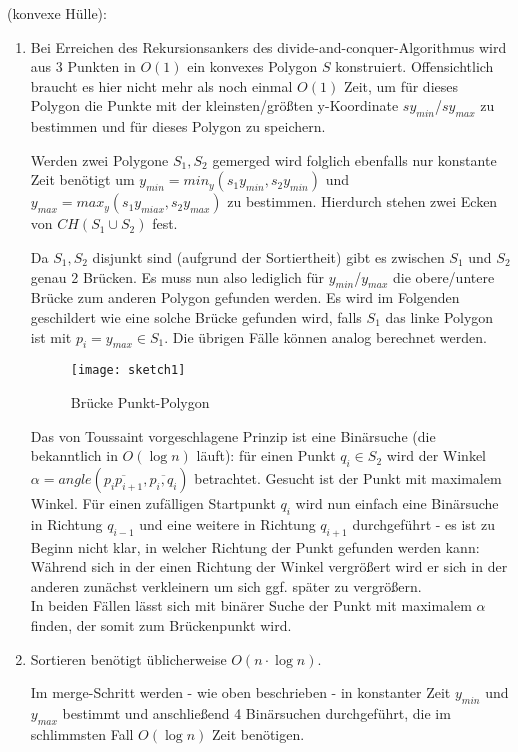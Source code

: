 \documentclass[a4paper, titlepage=false, parskip=full-, 10pt]{scrartcl}
\newcounter{tasknbr}
\newenvironment{task}[1]{{\bf Aufgabe \arabic {tasknbr}\stepcounter{tasknbr}} (#1):\begin{enumerate}}{\end{enumerate}}
\newcommand{\subtask}[1]{\item[#1)]}
\begin{document}
\begin{task}{konvexe Hülle}
\subtask{a}
Bei Erreichen des Rekursionsankers des divide-and-conquer-Algorithmus wird aus 3 Punkten in $O(1)$ ein konvexes Polygon $S$ konstruiert. Offensichtlich braucht es hier nicht mehr als noch einmal $O(1)$ Zeit, um für dieses Polygon die Punkte mit der kleinsten/größten y-Koordinate $sy_{min}$/$sy_{max}$ zu bestimmen und für dieses Polygon zu speichern.

Werden zwei Polygone $S_1,S_2$ gemerged wird folglich ebenfalls nur konstante Zeit benötigt um $y_{min}=min_y(s_1y_{min},s_2y_{min})$ und $y_{max}=max_y(s_1y_{miax},s_2y_{max})$ zu bestimmen. Hierdurch stehen zwei Ecken von $CH(S_1\cup S_2)$ fest.

Da $S_1,S_2$ disjunkt sind (aufgrund der Sortiertheit) gibt es zwischen $S_1$ und $S_2$ genau 2 Brücken. Es muss nun also lediglich für $y_{min}$/$y_{max}$ die obere/untere Brücke zum anderen Polygon gefunden werden. Es wird im Folgenden geschildert wie eine solche Brücke gefunden wird, falls $S_1$ das linke Polygon ist mit $p_i=y_{max}\in S_1$. Die übrigen Fälle können analog berechnet werden.
\begin{figure}[htpb]
\begin{center}
\texttt{[image: sketch1]}
\end{center}
\caption{Brücke Punkt-Polygon}
\end{figure}

Das von Toussaint vorgeschlagene Prinzip ist eine Binärsuche (die bekanntlich in $O(\log n)$ läuft): für einen Punkt $q_i\in S_2$ wird der  Winkel $\alpha=angle(\overline{p_ip_{i+1}},\overline{p_i,q_i})$ betrachtet. Gesucht ist der Punkt mit maximalem Winkel. Für einen zufälligen Startpunkt $q_i$ wird nun einfach eine Binärsuche in Richtung $q_{i-1}$ und eine weitere in Richtung $q_{i+1}$ durchgeführt - es ist zu Beginn nicht klar, in welcher Richtung der Punkt gefunden werden kann: Während sich in der einen Richtung der Winkel vergrößert wird er sich in der anderen zunächst verkleinern um sich ggf. später zu vergrößern.\\
In beiden Fällen lässt sich mit binärer Suche der Punkt mit maximalem $\alpha$ finden, der somit zum Brückenpunkt wird.

\newpage
\subtask{b}
Sortieren benötigt üblicherweise $O(n\cdot\log n)$.

Im merge-Schritt werden - wie oben beschrieben - in konstanter Zeit $y_{min}$ und $y_{max}$ bestimmt und anschließend 4 Binärsuchen durchgeführt, die im schlimmsten Fall $O(\log n)$ Zeit benötigen.


\end{task}
\end{document}
